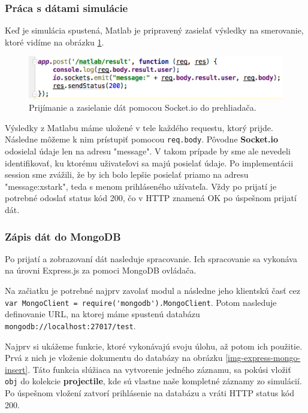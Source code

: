 \subsubsection{Práca s dátami simulácie}
Keď je simulácia spustená, Matlab je pripravený zasielať výsledky na smerovanie, ktoré vidíme na obrázku \ref{img-express-socketio}. 

\begin{figure}[H]
  \centering
  \includegraphics[scale=0.7]{img/code/express-socketio.png}
  \caption{Prijímanie a zasielanie dát pomocou Socket.io do prehliadača.}
  \label{img-express-socketio}
\end{figure}

Výsledky z Matlabu máme uložené v tele každého requestu, ktorý prijde. Následne môžeme k nim prístupiť pomocou \verb|req.body|. Pôvodne \textbf{Socket.io} odosielal údaje len na adresu "message". V takom prípade by sme ale nevedeli identifikovať, ku ktorému uživateľovi sa majú posielať údaje. Po implementácii session sme zvážili, že by ich bolo lepšie posielať priamo na adresu "message:xstark", teda s menom prihláseného užívateľa. Vždy po prijatí je potrebné odoslať status kód 200, čo v HTTP znamená OK po úspešnom prijatí dát.


\subsubsection{Zápis dát do MongoDB}
Po prijatí a zobrazovaní dát nasleduje spracovanie. Ich spracovanie sa vykonáva na úrovni Express.js za pomoci MongoDB ovládača.

Na začiatku je potrebné najprv zavolať modul a následne jeho klientskú časť cez \verb|var MongoClient = require('mongodb').MongoClient|. Potom nasleduje definovanie URL, na ktorej máme spustenú databázu \verb|mongodb://localhost:27017/test|.

Najprv si ukážeme funkcie, ktoré vykonávajú svoju úlohu, až potom ich použitie. Prvá z nich je vloženie dokumentu do databázy na obrázku \ref{img-express-mongo-insert}. Táto funkcia slúžiaca na vytvorenie jedného záznamu, sa pokúsi vložiť \verb|obj| do kolekcie \textbf{projectile}, kde sú vlastne naše kompletné záznamy zo simulácií. Po úspešnom vložení zatvorí prihlásenie na databázu a vráti HTTP status kód 200.

